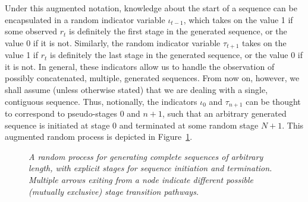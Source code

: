 \documentclass[a4paper]{article}
\begin{document}
Under this augmented notation, knowledge about the start of a sequence can be encapsulated in 
a random indicator variable $\iota_{t-1}$, which takes on the value 1 if some observed $r_{t}$ is definitely the first stage in the
generated sequence, or the value 0 if it is not. Similarly, the random indicator variable $\tau_{t+1}$
takes on the value 1 if $r_{t}$ is definitely the last stage in the generated sequence, or the value 0 if it is not.
In general, these indicators allow us to handle the observation of possibly concatenated, multiple, generated sequences.
From now on, however, we shall assume (unless otherwise stated) that we are dealing with a single, contiguous sequence.
Thus, notionally, the indicators $\iota_0$ and $\tau_{n+1}$ can be thought to correspond to pseudo-stages 0 and $n+1$, such that
an arbitrary generated sequence is initiated at stage 0 and terminated at some random stage $N+1$.
This augmented random process is depicted in Figure~\ref{fig:random-process}. 
\begin{figure}[hbt]
\centering
{}
\caption{\em A random process for generating complete sequences of arbitrary length,
with explicit stages for sequence initiation and termination. Multiple arrows exiting from a node indicate
different possible (mutually exclusive) stage transition pathways.}
\label{fig:random-process}
\end{figure}
\end{document}
